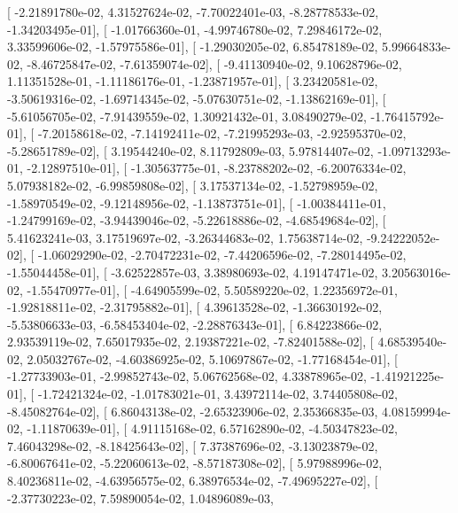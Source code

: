\documentclass{article}
\begin{document}
       [ -2.21891780e-02,   4.31527624e-02,  -7.70022401e-03,
         -8.28778533e-02,  -1.34203495e-01],
       [ -1.01766360e-01,  -4.99746780e-02,   7.29846172e-02,
          3.33599606e-02,  -1.57975586e-01],
       [ -1.29030205e-02,   6.85478189e-02,   5.99664833e-02,
         -8.46725847e-02,  -7.61359074e-02],
       [ -9.41130940e-02,   9.10628796e-02,   1.11351528e-01,
         -1.11186176e-01,  -1.23871957e-01],
       [  3.23420581e-02,  -3.50619316e-02,  -1.69714345e-02,
         -5.07630751e-02,  -1.13862169e-01],
       [ -5.61056705e-02,  -7.91439559e-02,   1.30921432e-01,
          3.08490279e-02,  -1.76415792e-01],
       [ -7.20158618e-02,  -7.14192411e-02,  -7.21995293e-03,
         -2.92595370e-02,  -5.28651789e-02],
       [  3.19544240e-02,   8.11792809e-03,   5.97814407e-02,
         -1.09713293e-01,  -2.12897510e-01],
       [ -1.30563775e-01,  -8.23788202e-02,  -6.20076334e-02,
          5.07938182e-02,  -6.99859808e-02],
       [  3.17537134e-02,  -1.52798959e-02,  -1.58970549e-02,
         -9.12148956e-02,  -1.13873751e-01],
       [ -1.00384411e-01,  -1.24799169e-02,  -3.94439046e-02,
         -5.22618886e-02,  -4.68549684e-02],
       [  5.41623241e-03,   3.17519697e-02,  -3.26344683e-02,
          1.75638714e-02,  -9.24222052e-02],
       [ -1.06029290e-02,  -2.70472231e-02,  -7.44206596e-02,
         -7.28014495e-02,  -1.55044458e-01],
       [ -3.62522857e-03,   3.38980693e-02,   4.19147471e-02,
          3.20563016e-02,  -1.55470977e-01],
       [ -4.64905599e-02,   5.50589220e-02,   1.22356972e-01,
         -1.92818811e-02,  -2.31795882e-01],
       [  4.39613528e-02,  -1.36630192e-02,  -5.53806633e-03,
         -6.58453404e-02,  -2.28876343e-01],
       [  6.84223866e-02,   2.93539119e-02,   7.65017935e-02,
          2.19387221e-02,  -7.82401588e-02],
       [  4.68539540e-02,   2.05032767e-02,  -4.60386925e-02,
          5.10697867e-02,  -1.77168454e-01],
       [ -1.27733903e-01,  -2.99852743e-02,   5.06762568e-02,
          4.33878965e-02,  -1.41921225e-01],
       [ -1.72421324e-02,  -1.01783021e-01,   3.43972114e-02,
          3.74405808e-02,  -8.45082764e-02],
       [  6.86043138e-02,  -2.65323906e-02,   2.35366835e-03,
          4.08159994e-02,  -1.11870639e-01],
       [  4.91115168e-02,   6.57162890e-02,  -4.50347823e-02,
          7.46043298e-02,  -8.18425643e-02],
       [  7.37387696e-02,  -3.13023879e-02,  -6.80067641e-02,
         -5.22060613e-02,  -8.57187308e-02],
       [  5.97988996e-02,   8.40236811e-02,  -4.63956575e-02,
          6.38976534e-02,  -7.49695227e-02],
       [ -2.37730223e-02,   7.59890054e-02,   1.04896089e-03,
\end{document}
